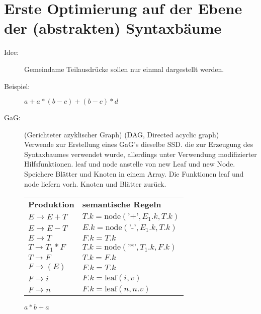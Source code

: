 \section{Erste Optimierung auf der Ebene der (abstrakten) Syntaxbäume}
\begin{description}
\item[Idee:] Gemeindame Teilausdrücke sollen nur einmal dargestellt werden.
\item[Beispiel:] $a + a * (b - c) + (b - c) * d$
\item[GaG:] (Gerichteter azyklischer Graph) (DAG, Directed acyclic graph)\\
    Verwende zur Erstellung eines GaG's dieselbe SSD. die zur Erzeugung des Syntaxbaumes verwendet wurde, allerdings unter Verwendung modifizierter Hilfsfunktionen. leaf und node anstelle von new Leaf und new Node. \\
    Speichere Blätter und Knoten in einem Array. Die Funktionen leaf und node liefern vorh. Knoten und Blätter zurück.
    \begin{center}
        \begin{tabular}{l|l}
            \textbf{Produktion} & \textbf{semantische Regeln} \\
            $E \to E + T$       & $T.k = \text{node}(\texttt{'+'}, E_1.k, T.k)$\\
            $E \to E - T$       & $E.k = \text{node}(\texttt{'-'}, E_1.k, T.k)$\\
            $E \to T$           & $F.k = T.k$\\
            $T \to T_1 * F$     & $T.k = \text{node}(\texttt{'*'}, T_1.k, F.k)$\\
            $T \to F$           & $T.k = F.k$\\
            $F \to (E)$         & $F.k = T.k$\\
            $F \to i$           & $F.k = \text{leaf}(i,v)$\\
            $F \to n$           & $F.k = \text{leaf}(n, n.v)$
        \end{tabular}
    \end{center}
    $a * b + a$
    \begin{center}
\end{center}
\end{description}
